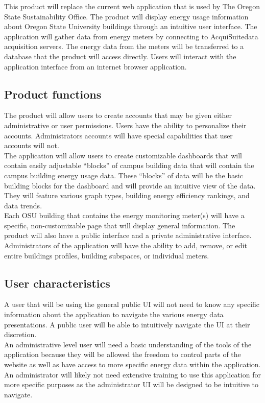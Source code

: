 \documentclass[onecolumn, draftclsnofoot,10pt, compsoc]{IEEEtran}
\begin{document}
    This product will replace the current web application that is used by The Oregon State Sustainability Office. The product will display energy usage information about Oregon State University buildings through an intuitive user interface. The application will gather data from energy meters by connecting to AcquiSuite\texttrademark data acquisition servers. The energy data from the meters will be transferred to a database that the product will access directly. Users will interact with the application interface from an internet browser application. 
    
    \subsection{Product functions}
    The product will allow users to create accounts that may be given either administrative or user permissions. Users have the ability to personalize their accounts. Administrators accounts will have special capabilities that user accounts will not. \\
    The application will allow users to create customizable dashboards that will contain easily adjustable “blocks” of campus building data that will contain the campus building energy usage data. These “blocks” of data will be the basic building blocks for the dashboard and will provide an intuitive view of the data. They will feature various graph types, building energy efficiency rankings, and data trends.\\
    Each OSU building that contains the energy monitoring meter(s) will have a specific, non-customizable page that will display general information. The product will also have a public interface and a private administrative interface.\\
    Administrators of the application will have the ability to add, remove, or edit entire buildings profiles, building subspaces, or individual meters.
    
    \subsection{User characteristics}
    A user that will be using the general public UI will not need to know any specific information about the application to navigate the various energy data presentations. A public user will be able to intuitively navigate the UI at their discretion. \\ 
    An administrative level user will need a basic understanding of the tools of the application because they will be allowed the freedom to control parts of the website as well as have access to more specific energy data within the application. An administrator will likely not need extensive training to use this application for more specific purposes as the administrator UI will be designed to be intuitive to navigate.
\end{document}
